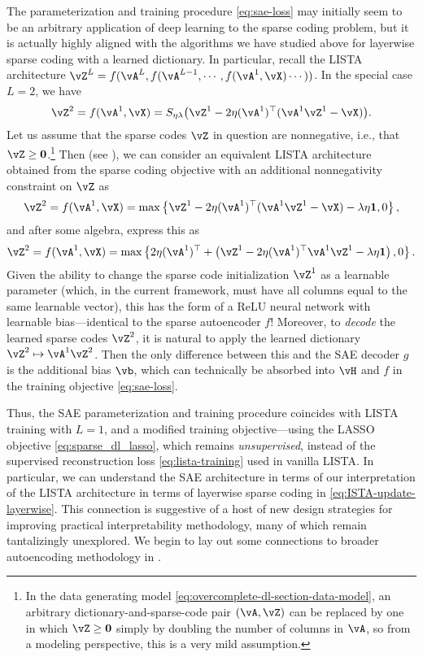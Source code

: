 \documentclass[../../book-main.tex]{subfiles}
\begin{document}
The parameterization and training procedure \eqref{eq:sae-loss} may initially
seem to be an arbitrary application of deep learning to the sparse coding
problem, but it is actually highly aligned with the algorithms we have studied
above for layerwise sparse coding with a learned dictionary.
In particular, recall the LISTA %
architecture $\vZ^{L} = f(\vA^L, f(\vA^{L-1}, \cdots, f(\vA^1, \vX) \cdots ))$.
In the special case $L=2$, we have
\begin{equation}
    \vZ^2 = f(\vA^1, \vX) 
    =S_{\eta\lambda}\rp{\vZ^{1} - 2\eta(\vA^{1})^{\top}(\vA^1\vZ^{1} - \vX)}.
\end{equation}
Let us assume that the sparse codes $\vZ$ in question are nonnegative, i.e.,
that $\vZ \geq \Zero$.\footnote{In the data generating model
\eqref{eq:overcomplete-dl-section-data-model}, an arbitrary
dictionary-and-sparse-code pair $(\vA, \vZ)$ can be replaced by one in which
$\vZ \geq \Zero$ simply by doubling the number of columns in $\vA$, so from
a modeling perspective, this is a very mild assumption.}
Then (see ), we can consider an equivalent
LISTA architecture obtained from the sparse coding objective with an additional
nonnegativity constraint on $\vZ$ as
\begin{equation}
    \vZ^2 = f(\vA^1, \vX) 
    =\max \set*{\vZ^{1} - 2\eta(\vA^{1})^{\top}(\vA^1\vZ^{1} - \vX)
    - \lambda\eta \mathbf{1}, 0},
\end{equation}
and after some algebra, express this as
\begin{equation}
    \vZ^2 = f(\vA^1, \vX) 
    =\max \set*{
        2\eta(\vA^{1})^{\top}
        +
        \left(
        \vZ^{1} - 2\eta(\vA^{1})^{\top}\vA^1\vZ^{1} - \lambda\eta \mathbf{1}
        \right), 0
    }.
\end{equation}
Given the ability to change the sparse code initialization $\vZ^1$ as
a learnable parameter (which, in the current framework, must have all columns
equal to the same learnable vector), this has the form of a ReLU neural network
with learnable bias---identical to the sparse autoencoder $f$!
Moreover, to \textit{decode} the learned sparse codes $\vZ^2$, it is natural to
apply the learned dictionary $\vZ^2 \mapsto \vA^1 \vZ^2$. Then the only
difference between this and the SAE decoder $g$ is the additional bias $\vb$,
which can technically be absorbed into $\vH$ and $f$ in the training objective
\eqref{eq:sae-loss}.

Thus, the SAE parameterization and training procedure coincides with
LISTA training with $L=1$, and a modified training objective---using the
LASSO objective \eqref{eq:sparse_dl_lasso}, which remains {\em unsupervised}, instead
of the supervised reconstruction loss \eqref{eq:lista-training} used in vanilla
LISTA. In particular, we can understand the SAE architecture in terms of our
interpretation of the LISTA architecture in terms of layerwise sparse coding in
\eqref{eq:ISTA-update-layerwise}. This connection is suggestive of a host of new
design strategies for improving practical interpretability methodology, many of
which remain tantalizingly unexplored. We begin to lay out some connections to
broader autoencoding methodology in .
\end{document}
